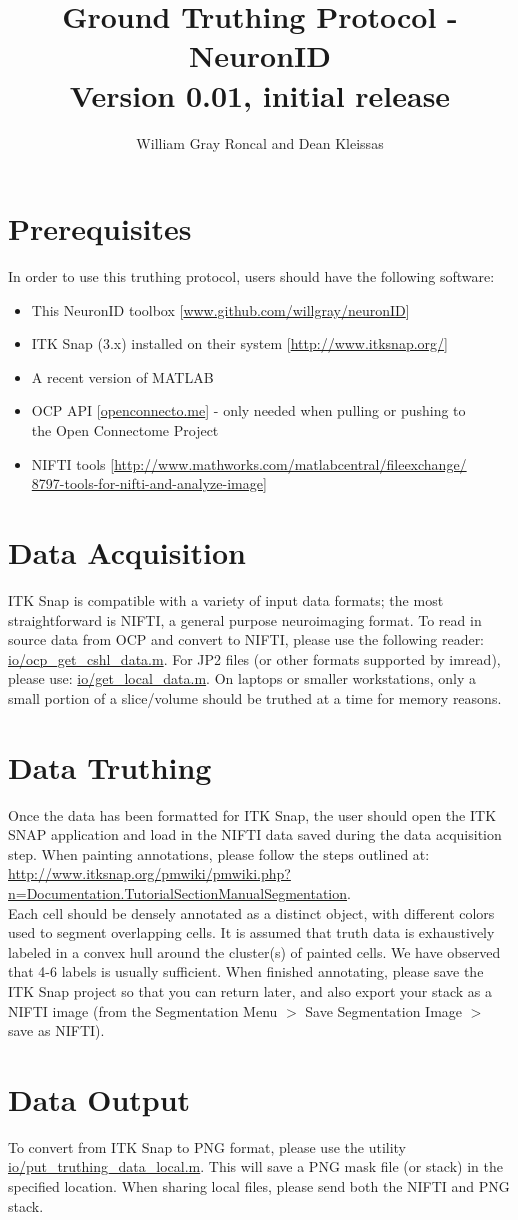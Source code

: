 \documentclass[11pt]{amsart}
\title{Ground Truthing Protocol - NeuronID \\
 Version 0.01, initial release}
\author{William Gray Roncal and Dean Kleissas}
\begin{document}
\maketitle

\section{Prerequisites}

In order to use this truthing protocol, users should have the following software:
\begin{itemize}
\item{This NeuronID toolbox [\url{www.github.com/willgray/neuronID}]}
\item{ITK Snap (3.x) installed on their system [\url{http://www.itksnap.org/}]}
\item{A recent version of MATLAB}
\item{OCP API [\url{openconnecto.me}] - only needed when pulling or pushing to \\ the Open Connectome Project}
\item{NIFTI tools  [\url{http://www.mathworks.com/matlabcentral/fileexchange/} \\ \url{8797-tools-for-nifti-and-analyze-image]}}

\end{itemize}

\section{Data Acquisition}

\noindent ITK Snap is compatible with a variety of input data formats; the most straightforward is NIFTI, a general purpose neuroimaging format.  To read in source data from OCP and convert to NIFTI, please use the following reader: \url{io/ocp_get_cshl_data.m}.  For JP2 files (or other formats supported by imread), please use: \url{io/get_local_data.m}.  On laptops or smaller workstations, only a small portion of a slice/volume should be truthed at a time for memory reasons.  

\section{Data Truthing}
\noindent Once the data has been formatted for ITK Snap, the user should open the ITK SNAP application and load in the NIFTI data saved during the data acquisition step.  When painting annotations, please follow the steps outlined at: \url{http://www.itksnap.org/pmwiki/pmwiki.php?n=Documentation.TutorialSectionManualSegmentation}.  \\
\noindent Each cell should be densely annotated as a distinct object, with different colors used to segment overlapping cells.  It is assumed that truth data is exhaustively labeled in a convex hull around the cluster(s) of painted cells.   We have observed that 4-6 labels is usually sufficient.  When finished annotating, please save the ITK Snap project so that you can return later, and also export your stack as a NIFTI image (from the Segmentation Menu $>$ Save Segmentation Image $>$ save as NIFTI).  

\section{Data Output}
To convert from ITK Snap to PNG format, please use the utility \url{io/put_truthing_data_local.m}.  This will save a PNG mask file (or stack) in the specified location.  When sharing local files, please send both the NIFTI and PNG stack.
\end{document}
